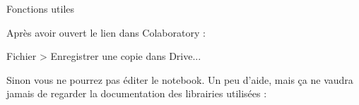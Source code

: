 \begin{frame}{Fonctions utiles}
  \begin{center}
  \end{center}
  Après avoir ouvert le lien dans Colaboratory :
  \begin{center}
    Fichier > Enregistrer une copie dans Drive...
  \end{center}
  Sinon vous ne pourrez pas éditer le notebook.
  \newlinebar
  Un peu d'aide, mais ça ne vaudra jamais de regarder la documentation des librairies utilisées :
  \begin{center}
  \end{center}
\end{frame}
